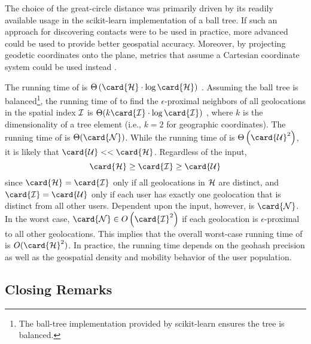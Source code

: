 The choice of the great-circle distance was primarily driven by its readily available usage in the scikit-learn \cite{sklearn2013} implementation of a ball tree. If such an approach for discovering contacts were to be used in practice, more advanced  \cite[pp. 71--130]{Lu2014} could be used to provide better geospatial accuracy. Moreover, by projecting geodetic coordinates onto the plane, metrics that assume a Cartesian coordinate system could be used instead \cite[pp. 265--326]{Lu2014}.

The running time of  is $\Theta\left(\card{\histories} \cdot \log\card{\histories}\right)$ \cite{Omohundro1989}. Assuming the ball tree is balanced\footnote{The ball-tree implementation provided by scikit-learn \cite{sklearn2013} ensures the tree is balanced.}, the running time of  to find the $\epsilon$-proximal neighbors of all geolocations in the spatial index $\mathcal{I}$ is $\Theta(k \card{\sindex} \cdot \log\card{\sindex})$ , where $k$ is the dimensionality of a tree element (i.e., $k = 2$ for geographic coordinates). The running time of  is $\Theta(\card{\query})$. While the running time of  is $\Theta\left(\card{\users}^2\right)$, it is likely that $\card{\users} << \card{\histories}$. Regardless of the input,
	\begin{equation*}
		\card{\histories} \geq \card{\sindex} \geq \card{\users}
	\end{equation*}
since $\card{\histories} = \card{\sindex}$ only if all geolocations in $\mathcal{H}$ are distinct, and $\card{\sindex} = \card{\users}$ only if each user has exactly one geolocation that is distinct from all other users. Dependent upon the input, however, is $\card{\query}$. In the worst case, $\card{\query} \in O\left(\card{\sindex}^2\right)$ if each geolocation is $\epsilon$-proximal to all other geolocations. This implies that the overall worst-case running time of  is $O(\card{\histories}^2)$. In practice, the running time depends on the geohash precision as well as the geospatial density and mobility behavior of the user population.

\subsection{Closing Remarks}

